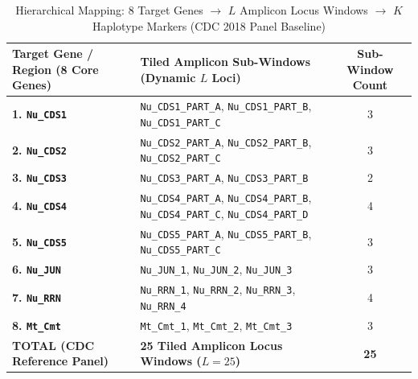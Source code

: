 \documentclass[11pt,a4paper]{article}
\begin{document}
\begin{table}[h]
\centering
\small
\caption{Hierarchical Mapping: 8 Target Genes $\longrightarrow$ $L$ Amplicon Locus Windows $\longrightarrow$ $K$ Haplotype Markers (CDC 2018 Panel Baseline)}
\label{tab:locus_mapping}
\begin{tabularx}{\textwidth}{p{4.5cm} X c}
\toprule
\textbf{Target Gene / Region (8 Core Genes)} & \textbf{Tiled Amplicon Sub-Windows (Dynamic $L$ Loci)} & \textbf{Sub-Window Count} \\
\midrule
\textbf{1. \texttt{Nu\_CDS1}} & \texttt{Nu\_CDS1\_PART\_A}, \texttt{Nu\_CDS1\_PART\_B}, \texttt{Nu\_CDS1\_PART\_C} & 3 \\
\textbf{2. \texttt{Nu\_CDS2}} & \texttt{Nu\_CDS2\_PART\_A}, \texttt{Nu\_CDS2\_PART\_B}, \texttt{Nu\_CDS2\_PART\_C} & 3 \\
\textbf{3. \texttt{Nu\_CDS3}} & \texttt{Nu\_CDS3\_PART\_A}, \texttt{Nu\_CDS3\_PART\_B} & 2 \\
\textbf{4. \texttt{Nu\_CDS4}} & \texttt{Nu\_CDS4\_PART\_A}, \texttt{Nu\_CDS4\_PART\_B}, \texttt{Nu\_CDS4\_PART\_C}, \texttt{Nu\_CDS4\_PART\_D} & 4 \\
\textbf{5. \texttt{Nu\_CDS5}} & \texttt{Nu\_CDS5\_PART\_A}, \texttt{Nu\_CDS5\_PART\_B}, \texttt{Nu\_CDS5\_PART\_C} & 3 \\
\textbf{6. \texttt{Nu\_JUN}} & \texttt{Nu\_JUN\_1}, \texttt{Nu\_JUN\_2}, \texttt{Nu\_JUN\_3} & 3 \\
\textbf{7. \texttt{Nu\_RRN}} & \texttt{Nu\_RRN\_1}, \texttt{Nu\_RRN\_2}, \texttt{Nu\_RRN\_3}, \texttt{Nu\_RRN\_4} & 4 \\
\textbf{8. \texttt{Mt\_Cmt}} & \texttt{Mt\_Cmt\_1}, \texttt{Mt\_Cmt\_2}, \texttt{Mt\_Cmt\_3} & 3 \\
\midrule
\textbf{TOTAL (CDC Reference Panel)} & \textbf{25 Tiled Amplicon Locus Windows ($L=25$)} & \textbf{25} \\
\bottomrule
\end{tabularx}
\end{table}
\end{document}
